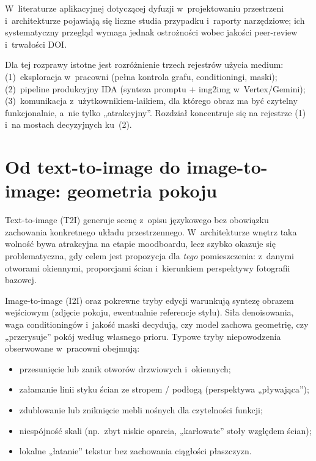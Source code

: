 W~literaturze aplikacyjnej dotyczącej dyfuzji w~projektowaniu przestrzeni i~architekturze pojawiają się liczne studia przypadku i~raporty narzędziowe; ich systematyczny przegląd wymaga jednak ostrożności wobec jakości peer-review i~trwałości DOI.

Dla tej rozprawy istotne jest rozróżnienie trzech rejestrów użycia medium: (1)~eksploracja w~pracowni (pełna kontrola grafu, conditioningi, maski); (2)~pipeline produkcyjny IDA (synteza promptu + img2img w~Vertex/Gemini); (3)~komunikacja z~użytkownikiem-laikiem, dla którego obraz ma być czytelny funkcjonalnie, a~nie tylko „atrakcyjny”. Rozdział koncentruje się na rejestrze (1) i~na mostach decyzyjnych ku~(2).

\section{Od text-to-image do image-to-image: geometria pokoju}
\label{ch04:sec:t2i-i2i}

Text-to-image (T2I) generuje scenę z~opisu językowego bez obowiązku zachowania konkretnego układu przestrzennego. W~architekturze wnętrz taka wolność bywa atrakcyjna na etapie moodboardu, lecz szybko okazuje się problematyczna, gdy celem jest propozycja dla \emph{tego} pomieszczenia: z~danymi otworami okiennymi, proporcjami ścian i~kierunkiem perspektywy fotografii bazowej.

Image-to-image (I2I) oraz pokrewne tryby edycji warunkują syntezę obrazem wejściowym (zdjęcie pokoju, ewentualnie referencje stylu). Siła denoisowania, waga conditioningów i~jakość maski decydują, czy model zachowa geometrię, czy „przerysuje” pokój według własnego prioru. Typowe tryby niepowodzenia obserwowane w~pracowni obejmują:
\begin{itemize}
  \item przesunięcie lub zanik otworów drzwiowych i~okiennych;
  \item załamanie linii styku ścian ze stropem / podłogą (perspektywa „pływająca”);
  \item zdublowanie lub zniknięcie mebli nośnych dla czytelności funkcji;
  \item niespójność skali (np.\ zbyt niskie oparcia, „karłowate” stoły względem ścian);
  \item lokalne „łatanie” tekstur bez zachowania ciągłości płaszczyzn.
\end{itemize}

